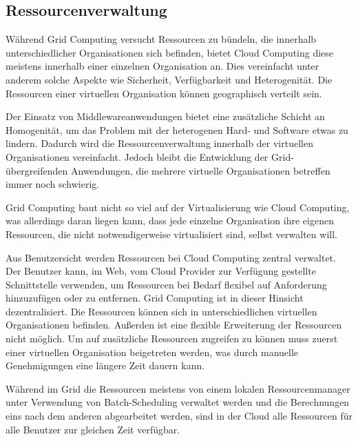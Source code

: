 
\subsection{Ressourcenverwaltung}
Während Grid Computing versucht Ressourcen zu bündeln, die innerhalb unterschiedlicher Organisationen sich befinden, bietet Cloud Computing diese meistens innerhalb einer einzelnen Organisation an. Dies vereinfacht unter anderem solche Aspekte wie Sicherheit, Verfügbarkeit und Heterogenität\cite{comp-cloud-grid-cluster-virt}.
Die Ressourcen einer virtuellen Organisation können geographisch verteilt sein.

Der Einsatz von Middlewareanwendungen bietet eine zusätzliche Schicht an Homogenität, um das Problem mit der heterogenen Hard- und Software etwas zu lindern. Dadurch wird die Ressourcenverwaltung innerhalb der virtuellen Organisationen vereinfacht. Jedoch bleibt die Entwicklung der Grid-übergreifenden Anwendungen, die mehrere virtuelle Organisationen betreffen immer noch schwierig.\cite{McEvoy:2008:UCA:1462704.1462715}

Grid Computing baut nicht so viel auf der Virtualisierung wie Cloud Computing, was allerdings daran liegen kann, dass jede einzelne Organisation ihre eigenen Ressourcen, die nicht notwendigerweise virtualisiert sind, selbst verwalten will\cite{360-degree-compared}. 

Aus Benutzersicht werden Ressourcen bei Cloud Computing zentral verwaltet.
Der Benutzer kann, im Web, vom Cloud Provider zur Verfügung gestellte Schnittstelle verwenden,
um Ressourcen bei Bedarf flexibel auf Anforderung hinzuzufügen oder zu entfernen.
Grid Computing ist in dieser Hinsicht dezentralisiert. Die Ressourcen können sich in unterschiedlichen virtuellen Organisationen befinden. Außerden ist eine flexible Erweiterung der Ressourcen nicht möglich. Um auf zusätzliche Ressourcen zugreifen zu können muss zuerst einer virtuellen Organisation beigetreten werden, was durch manuelle Genehmigungen eine längere Zeit dauern kann.

Während im Grid die Ressourcen meistens von einem lokalen Ressourcenmanager unter Verwendung von Batch-Scheduling verwaltet werden und die Berechnungen eins nach dem anderen abgearbeitet werden, sind in der Cloud alle Ressourcen für alle Benutzer zur gleichen Zeit verfügbar\cite{360-degree-compared}.



